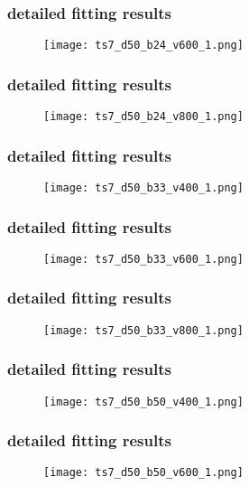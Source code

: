 	\begin{frame}
		\frametitle{\appendixname{} \textendash{} detailed fitting results}
		\begin{figure}
			\texttt{[image: ts7\_d50\_b24\_v600\_1.png]}
		\end{figure}
	\end{frame}

	\begin{frame}
		\frametitle{\appendixname{} \textendash{} detailed fitting results}
		\begin{figure}
			\texttt{[image: ts7\_d50\_b24\_v800\_1.png]}
		\end{figure}
	\end{frame}

	\begin{frame}
		\frametitle{\appendixname{} \textendash{} detailed fitting results}
		\begin{figure}
			\texttt{[image: ts7\_d50\_b33\_v400\_1.png]}
		\end{figure}
	\end{frame}

	\begin{frame}
		\frametitle{\appendixname{} \textendash{} detailed fitting results}
		\begin{figure}
			\texttt{[image: ts7\_d50\_b33\_v600\_1.png]}
		\end{figure}
	\end{frame}

	\begin{frame}
		\frametitle{\appendixname{} \textendash{} detailed fitting results}
		\begin{figure}
			\texttt{[image: ts7\_d50\_b33\_v800\_1.png]}
		\end{figure}
	\end{frame}

	\begin{frame}
		\frametitle{\appendixname{} \textendash{} detailed fitting results}
		\begin{figure}
			\texttt{[image: ts7\_d50\_b50\_v400\_1.png]}
		\end{figure}
	\end{frame}

	\begin{frame}
		\frametitle{\appendixname{} \textendash{} detailed fitting results}
		\begin{figure}
			\texttt{[image: ts7\_d50\_b50\_v600\_1.png]}
		\end{figure}
	\end{frame}

